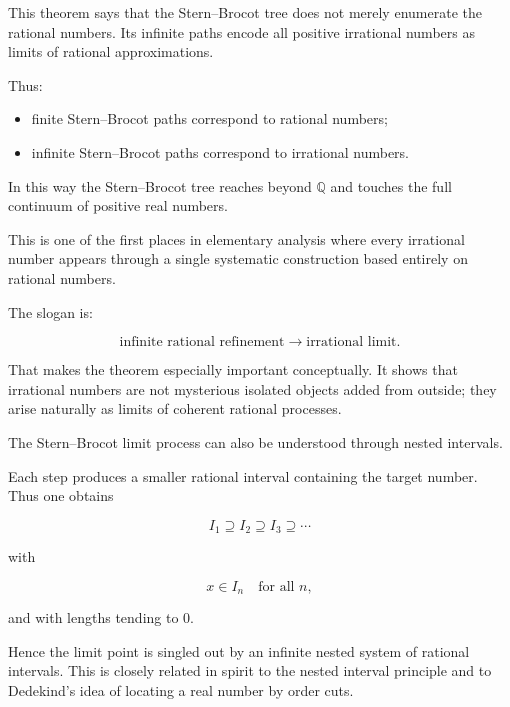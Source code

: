\begin{remark*}[Interpretation]
This theorem says that the Stern--Brocot tree does not merely enumerate
the rational numbers.  Its infinite paths encode all positive irrational
numbers as limits of rational approximations.

Thus:

\begin{itemize}
\item finite Stern--Brocot paths correspond to rational numbers;
\item infinite Stern--Brocot paths correspond to irrational numbers.
\end{itemize}

In this way the Stern--Brocot tree reaches beyond $\mathbb{Q}$ and
touches the full continuum of positive real numbers.
\end{remark*}

\begin{remark*}
This is one of the first places in elementary analysis where every
irrational number appears through a single systematic construction based
entirely on rational numbers.

The slogan is:

\[
\text{infinite rational refinement} \longrightarrow \text{irrational limit}.
\]

That makes the theorem especially important conceptually.  It shows that
irrational numbers are not mysterious isolated objects added from
outside; they arise naturally as limits of coherent rational processes.
\end{remark*}


\begin{remark*}
The Stern--Brocot limit process can also be understood through nested
intervals.

Each step produces a smaller rational interval containing the target
number.  Thus one obtains

\[
I_1 \supseteq I_2 \supseteq I_3 \supseteq \cdots
\]

with

\[
x \in I_n
\quad\text{for all }n,
\]

and with lengths tending to $0$.

Hence the limit point is singled out by an infinite nested system of
rational intervals.  This is closely related in spirit to the nested
interval principle and to Dedekind's idea of locating a real number by
order cuts.
\end{remark*}

